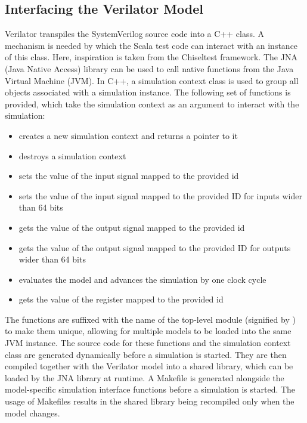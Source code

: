 \subsection{Interfacing the Verilator Model} %

Verilator transpiles the SystemVerilog source code into a C++ class. A mechanism is needed by which the Scala test
code can interact with an instance of this class. Here, inspiration is taken from the Chiseltest framework. The JNA (Java Native Access) library can be used to call native
functions from the Java Virtual Machine (JVM). In C++, a simulation context class is used to group all objects associated with a simulation instance. The following set of functions is provided, which take the simulation context as an argument to interact
with the simulation:

\begin{itemize}
  \item {} creates a new simulation context and returns a pointer to it
  \item {} destroys a simulation context
  \item {} sets the value of the input signal mapped to the provided id
  \item {} sets the value of the input signal mapped to the provided ID for inputs wider than 64 bits
  \item {} gets the value of the output signal mapped to the provided id
  \item {} gets the value of the output signal mapped to the provided ID for outputs wider than 64 bits
  \item {} evaluates the model and advances the simulation by one clock cycle
  \item {} gets the value of the register mapped to the provided id
\end{itemize}

The functions are suffixed with the name of the top-level module (signified by ) to make them unique,
allowing for multiple models to be loaded into the same JVM instance. The source code for these functions and the simulation context class are generated dynamically before a simulation is started. They are then
compiled together with the Verilator model into a shared library, which can be loaded by the JNA library at runtime. A
Makefile is generated alongside the model-specific simulation interface functions before a
simulation is started. The usage of Makefiles results in the shared library being recompiled only when the model changes.

